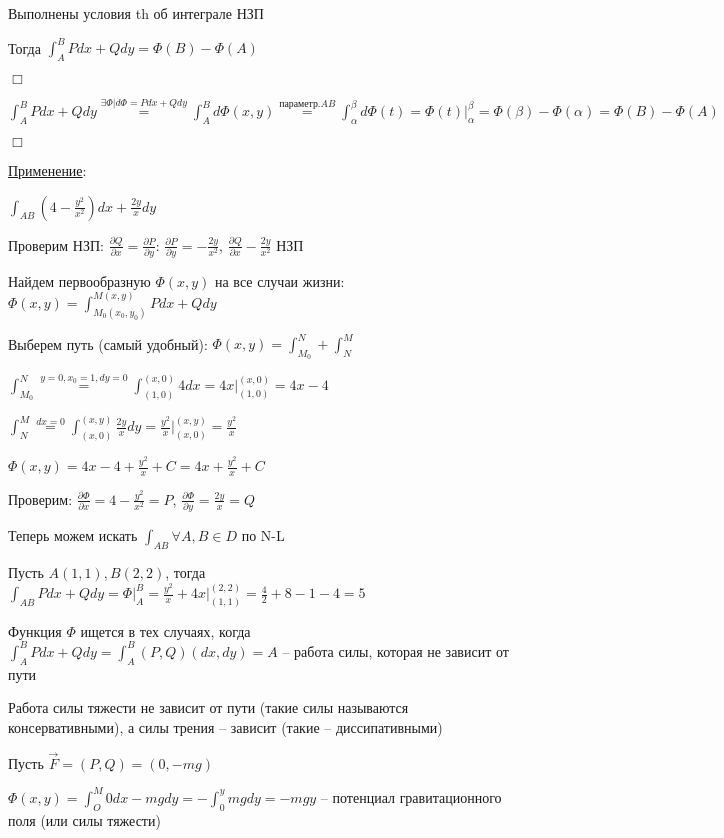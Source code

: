 \documentclass[12pt]{article}
\begin{document}
    Выполнены условия th об интеграле НЗП

    Тогда $\int_A^B Pdx + Qdy = \Phi(B) - \Phi(A)$

    $\Box$

    $\int_A^B Pdx + Qdy \stackrel{\exists \Phi | d\Phi = Pdx + Qdy}{=} \int_A^B d\Phi(x, y) \stackrel{\text{параметр.} AB}{=}
    \int_\alpha^\beta d\Phi(t) = \Phi(t) \Big|_\alpha^\beta = \Phi(\beta) - \Phi(\alpha) = \Phi(B) - \Phi(A)$

    $\Box$

    \underline{Применение}:

    \Ex $\int_{AB} \left(4 - \frac{y^2}{x^2}\right)dx + \frac{2y}{x}dy$

    Проверим НЗП: $\frac{\partial Q}{\partial x} = \frac{\partial P}{\partial y}$: $\frac{\partial P}{\partial y} = -\frac{2y}{x^2}$, $\frac{\partial Q}{\partial x} -\frac{2y}{x^2}$ \Longleftrightarrow НЗП

    Найдем первообразную $\Phi(x, y)$ на все случаи жизни:
    $\Phi(x, y) = \int_{M_0(x_0, y_0)}^{M(x, y)} Pdx + Qdy$

    Выберем путь (самый удобный): $\Phi(x, y) = \int_{M_0}^{N} + \int_{N}^{M}$

    $\int_{M_0}^{N} \stackrel{y = 0, x_0 = 1, dy = 0}{=} \int_{(1, 0)}^{(x, 0)} 4 dx = 4x \Big|_{(1,0)}^{(x,0)} = 4x - 4$

    $\int_{N}^{M} \stackrel{dx = 0}{=} \int_{(x, 0)}^{(x, y)} \frac{2y}{x} dy = \frac{y^2}{x} \Big|_{(x,0)}^{(x,y)} = \frac{y^2}{x}$

    $\Phi(x, y) = 4x - 4 + \frac{y^2}{x} + C = 4x + \frac{y^2}{x} + C$

    Проверим: $\frac{\partial \Phi}{\partial x} = 4 - \frac{y^2}{x^2} = P$, $\frac{\partial \Phi}{\partial y} = \frac{2y}{x} = Q$

    Теперь можем искать $\int_{AB} \forall A, B \in D$ по N-L

    Пусть $A(1, 1), B(2, 2)$, тогда
    $\int_{AB} Pdx + Qdy = \Phi \Big|_A^B = \frac{y^2}{x} + 4x \Big|_{(1,1)}^{(2,2)} = \frac{4}{2} + 8 - 1 - 4 = 5$

    \Nota Функция $\Phi$ ищется в тех случаях, когда $\int_A^B Pdx + Qdy = \int^B_A (P, Q) (dx, dy) = A$ -- работа силы, которая не зависит от пути

    \Exs Работа силы тяжести не зависит от пути (такие силы называются консервативными), а силы трения -- зависит (такие -- диссипативными)

    \Ex Пусть $\vec{F} = (P, Q) = (0, -mg)$

    $\Phi(x, y) = \int_O^M 0dx - mgdy = -\int_0^y mgdy = -mgy$ -- потенциал гравитационного поля (или силы тяжести)
\end{document}
